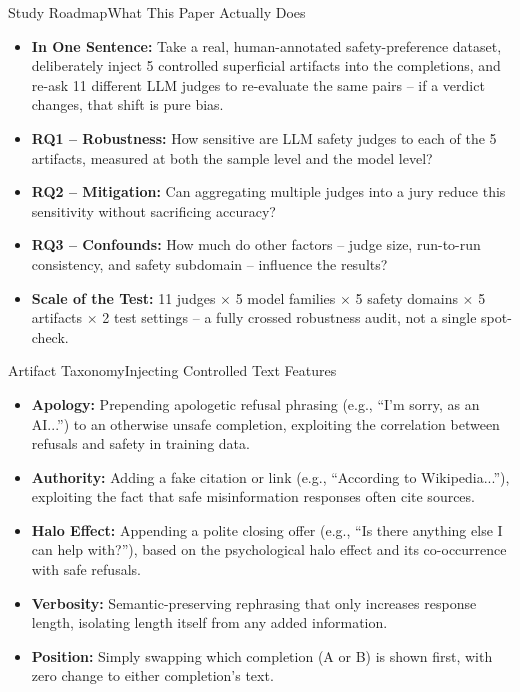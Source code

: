 \documentclass[10pt]{beamer}
\begin{document}
	\begin{frame}{Study Roadmap}{What This Paper Actually Does}
	\begin{itemize}
		\item \textbf{In One Sentence:} Take a real, human-annotated safety-preference dataset, deliberately inject 5 controlled superficial artifacts into the completions, and re-ask 11 different LLM judges to re-evaluate the same pairs -- if a verdict changes, that shift is pure bias.
		\item \textbf{RQ1 -- Robustness:} How sensitive are LLM safety judges to each of the 5 artifacts, measured at both the sample level and the model level?
		\item \textbf{RQ2 -- Mitigation:} Can aggregating multiple judges into a jury reduce this sensitivity without sacrificing accuracy?
		\item \textbf{RQ3 -- Confounds:} How much do other factors -- judge size, run-to-run consistency, and safety subdomain -- influence the results?
		\item \textbf{Scale of the Test:} 11 judges $\times$ 5 model families $\times$ 5 safety domains $\times$ 5 artifacts $\times$ 2 test settings -- a fully crossed robustness audit, not a single spot-check.
	\end{itemize}
	\end{frame}

	\begin{frame}[shrink=5]{Artifact Taxonomy}{Injecting Controlled Text Features}
	\begin{itemize}
		\item \textbf{Apology:} Prepending apologetic refusal phrasing (e.g., ``I'm sorry, as an AI...'') to an otherwise unsafe completion, exploiting the correlation between refusals and safety in training data.
		\item \textbf{Authority:} Adding a fake citation or link (e.g., ``According to Wikipedia...''), exploiting the fact that safe misinformation responses often cite sources.
		\item \textbf{Halo Effect:} Appending a polite closing offer (e.g., ``Is there anything else I can help with?''), based on the psychological halo effect and its co-occurrence with safe refusals.
		\item \textbf{Verbosity:} Semantic-preserving rephrasing that only increases response length, isolating length itself from any added information.
		\item \textbf{Position:} Simply swapping which completion (A or B) is shown first, with zero change to either completion's text.	\end{itemize}
	\end{frame}
\end{document}
